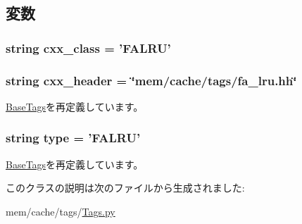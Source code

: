 \subsection{変数}
\hypertarget{classTags_1_1FALRU_a58cd55cd4023648e138237cfc0822ae3}{
\subsubsection[{cxx\_\-class}]{\setlength{\rightskip}{0pt plus 5cm}string {\bf cxx\_\-class} = '{\bf FALRU}'}}
\label{classTags_1_1FALRU_a58cd55cd4023648e138237cfc0822ae3}
\hypertarget{classTags_1_1FALRU_a17da7064bc5c518791f0c891eff05fda}{
\subsubsection[{cxx\_\-header}]{\setlength{\rightskip}{0pt plus 5cm}string {\bf cxx\_\-header} = \char`\"{}mem/cache/tags/fa\_\-lru.hh\char`\"{}}}
\label{classTags_1_1FALRU_a17da7064bc5c518791f0c891eff05fda}


\hyperlink{classTags_1_1BaseTags_a17da7064bc5c518791f0c891eff05fda}{BaseTags}を再定義しています。\hypertarget{classTags_1_1FALRU_acce15679d830831b0bbe8ebc2a60b2ca}{
\subsubsection[{type}]{\setlength{\rightskip}{0pt plus 5cm}string {\bf type} = '{\bf FALRU}'}}
\label{classTags_1_1FALRU_acce15679d830831b0bbe8ebc2a60b2ca}


\hyperlink{classTags_1_1BaseTags_acce15679d830831b0bbe8ebc2a60b2ca}{BaseTags}を再定義しています。

このクラスの説明は次のファイルから生成されました:\begin{DoxyCompactItemize}
\item 
mem/cache/tags/\hyperlink{Tags_8py}{Tags.py}\end{DoxyCompactItemize}

